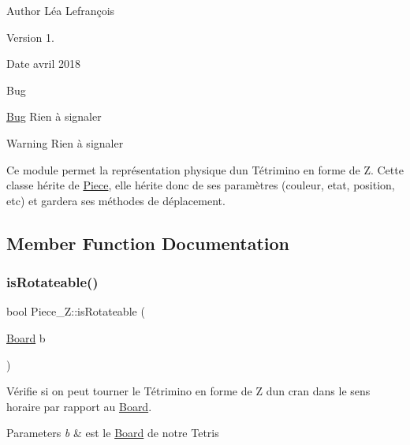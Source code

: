 \begin{DoxyAuthor}{Author}
Léa Lefrançois 
\end{DoxyAuthor}
\begin{DoxyVersion}{Version}
1. 
\end{DoxyVersion}
\begin{DoxyDate}{Date}
avril 2018 
\end{DoxyDate}
\begin{DoxyRefDesc}{Bug}
\item[\hyperlink{bug__bug000017}{Bug}]Rien à signaler \end{DoxyRefDesc}
\begin{DoxyWarning}{Warning}
Rien à signaler
\end{DoxyWarning}
Ce module permet la représentation physique d\textquotesingle{}un Tétrimino en forme de Z. Cette classe hérite de \hyperlink{classPiece}{Piece}, elle hérite donc de ses paramètres (couleur, etat, position, etc) et gardera ses méthodes de déplacement. 

\subsection{Member Function Documentation}
\mbox{\label{classPiece__Z_aa70256d6f49dacad685a15c5ae8df06d}} 
\subsubsection{\texorpdfstring{is\+Rotateable()}{isRotateable()}}
{\footnotesize\ttfamily bool Piece\+\_\+\+Z\+::is\+Rotateable (\begin{DoxyParamCaption}\item[{\hyperlink{classBoard}{Board}}]{b }\end{DoxyParamCaption})\hspace{0.3cm}{\ttfamily [virtual]}}



Vérifie si on peut tourner le Tétrimino en forme de Z d\textquotesingle{}un cran dans le sens horaire par rapport au \hyperlink{classBoard}{Board}. 


\begin{DoxyParams}{Parameters}
{\em b} & est le \hyperlink{classBoard}{Board} de notre Tetris \\
\hline
\end{DoxyParams}



